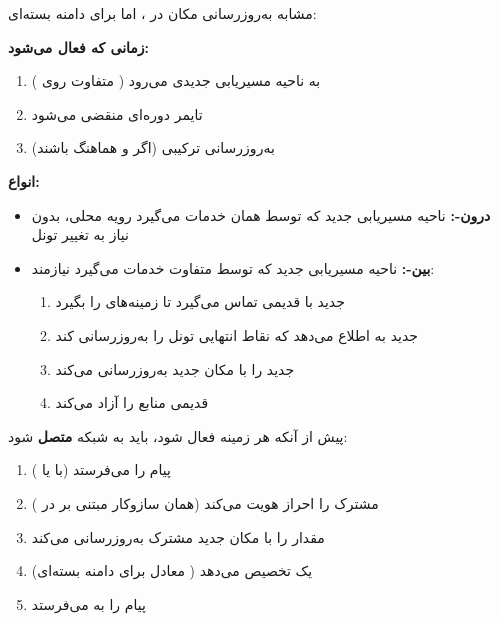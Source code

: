 مشابه به‌روزرسانی مکان در ، اما برای دامنه بسته‌ای:

\textbf{زمانی که فعال می‌شود:}

\begin{enumerate}
\def\labelenumi{\arabic{enumi}.}
\tightlist
\item
   به ناحیه مسیریابی جدیدی می‌رود ( متفاوت روی )
\item
  تایمر  دوره‌ای منقضی می‌شود
\item
  به‌روزرسانی ترکیبی  (اگر  و  هماهنگ باشند)
\end{enumerate}

\textbf{انواع:}

\begin{itemize}
\tightlist
\item
  \textbf{ درون-:} ناحیه مسیریابی جدید که توسط همان  خدمات می‌گیرد  رویه محلی، بدون نیاز به تغییر تونل 
\item
  \textbf{ بین-:} ناحیه مسیریابی جدید که توسط  متفاوت خدمات می‌گیرد  نیازمند:

  \begin{enumerate}
  \def\labelenumi{\arabic{enumi}.}
  \tightlist
  \item
     جدید با  قدیمی تماس می‌گیرد تا زمینه‌های  را بگیرد
  \item
     جدید به  اطلاع می‌دهد که نقاط انتهایی تونل را به‌روزرسانی کند
  \item
     جدید  را با مکان جدید به‌روزرسانی می‌کند
  \item
     قدیمی منابع را آزاد می‌کند
  \end{enumerate}
\end{itemize}


پیش از آنکه هر زمینه  فعال شود،  باید به شبکه  \textbf{متصل} شود:

\begin{enumerate}
\def\labelenumi{\arabic{enumi}.}
\tightlist
\item
   پیام  را می‌فرستد (با  یا )
\item
   مشترک را احراز هویت می‌کند (همان سازوکار مبتنی بر  در )
\item
   مقدار  را با مکان  جدید مشترک به‌روزرسانی می‌کند
\item
   یک  تخصیص می‌دهد (  معادل  برای دامنه بسته‌ای)
\item
   پیام  را به  می‌فرستد
\end{enumerate}

